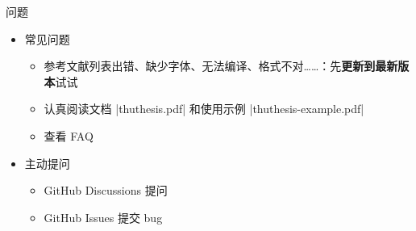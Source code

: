 \begin{frame}[fragile]{\ThuThesis 问题}
    \begin{itemize}
      \item 常见问题
        \begin{itemize}
          \item 参考文献列表出错、缺少字体、无法编译、格式不对……：先\textbf{更新到最新版本}试试
          \item 认真阅读文档 |thuthesis.pdf| 和使用示例 |thuthesis-example.pdf|
          \item 查看 FAQ 
        \end{itemize}
      \item 主动提问
        \begin{itemize}
          \item GitHub Discussions 提问 
          \item GitHub Issues 提交 bug 
        \end{itemize}
    \end{itemize}
\end{frame}



